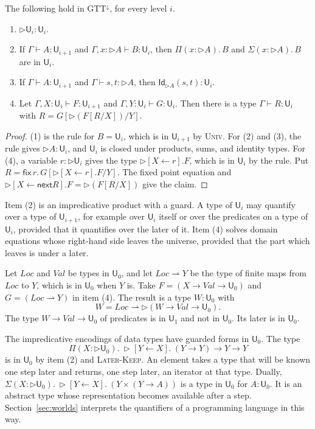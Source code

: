 \documentclass[acmsmall,nonacm,screen]{acmart}
\newcommand{\later}{{\triangleright}}
\newcommand{\nxt}{\mathsf{next}}
\newcommand{\fix}{\mathsf{fix}}
\newcommand{\Uv}{\mathsf{U}}
\newcommand{\Id}{\mathsf{Id}}
\newcommand{\dsub}[2]{[#1 \leftarrow #2]}
\newcommand{\Loc}{\mathit{Loc}}
\newcommand{\Val}{\mathit{Val}}
\newcommand{\Wld}{W}
\newcommand{\fmap}{\rightharpoonup}
\begin{document}
\begin{proposition}\label{prop:first}
The following hold in $\mathrm{GTT}^{\downarrow}$, for every level $i$.
\begin{enumerate}
\item $\later\Uv_i : \Uv_i$.
\item If $\Gamma \vdash A : \Uv_{i+1}$ and $\Gamma, x : \later A \vdash B : \Uv_i$, then
  $\Pi(x : \later A).\,B$ and $\Sigma(x : \later A).\,B$ are in $\Uv_i$.
\item If $\Gamma \vdash A : \Uv_{i+1}$ and $\Gamma \vdash s, t : \later A$, then
  $\Id_{\later A}(s,t) : \Uv_i$.
\item Let $\Gamma, X : \Uv_i \vdash F : \Uv_{i+1}$ and $\Gamma, Y : \Uv_i \vdash G : \Uv_i$.
  Then there is a type $\Gamma \vdash R : \Uv_i$ with $R = G[\later(F[R/X])/Y]$.
\end{enumerate}
\end{proposition}

\begin{proof}
(1) is the rule for $B = \Uv_i$, which is in $\Uv_{i+1}$ by \textsc{Univ}. For (2) and (3),
the rule gives $\later A : \Uv_i$, and $\Uv_i$ is closed under products, sums, and identity
types. For (4), a variable $r : \later\Uv_i$ gives the type $\later\dsub{X}{r}.F$, which is
in $\Uv_i$ by the rule. Put $R = \fix\,r.\,G[\later\dsub{X}{r}.F/Y]$. The fixed point
equation and $\later\dsub{X}{\nxt R}.F = \later(F[R/X])$ give the claim.
\end{proof}

Item (2) is an impredicative product with a guard. A type of $\Uv_i$ may quantify over a
type of $\Uv_{i+1}$, for example over $\Uv_i$ itself or over the predicates on a type of
$\Uv_i$, provided that it quantifies over the later of it. Item (4) solves domain equations
whose right-hand side leaves the universe, provided that the part which leaves is under a
later.

\begin{example}[Worlds]\label{ex:worlds}
Let $\Loc$ and $\Val$ be types in $\Uv_0$, and let $\Loc \fmap Y$ be the type of finite maps
from $\Loc$ to $Y$, which is in $\Uv_0$ when $Y$ is. Take $F = (X \to \Val \to \Uv_0)$ and
$G = (\Loc \fmap Y)$ in item (4). The result is a type $\Wld : \Uv_0$ with
\[
  \Wld = \Loc \fmap \later(\Wld \to \Val \to \Uv_0).
\]
The type $\Wld \to \Val \to \Uv_0$ of predicates is in $\Uv_1$ and not in $\Uv_0$. Its later
is in $\Uv_0$.
\end{example}

\begin{example}\label{ex:church}
The impredicative encodings of data types have guarded forms in $\Uv_0$. The type
\[
  \Pi(X : \later\Uv_0).\ \later\dsub{Y}{X}.\ (Y \to Y) \to Y \to Y
\]
is in $\Uv_0$ by item (2) and \textsc{Later-Keep}. An element takes a type that will be known
one step later and returns, one step later, an iterator at that type. Dually,
$\Sigma(X : \later\Uv_0).\ \later\dsub{Y}{X}.\ (Y \times (Y \to A))$ is a type in $\Uv_0$ for
$A : \Uv_0$. It is an abstract type whose representation becomes available after a step.
Section~\ref{sec:worlds} interprets the quantifiers of a programming language in this way.
\end{example}
\end{document}
